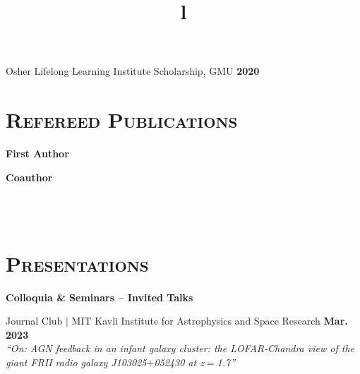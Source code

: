 \documentclass[marg, centered]{res}
\begin{document}
\begin{resume}
{Osher Lifelong Learning Institute Scholarship, GMU \hfill \textbf{2020}}
\vspace{-0.0cm}


\section{{\scshape \bfseries Refereed Publications}}

\vspace{-0.1cm}
\textbf{First Author}
\vspace{0.05cm}

\textbf{Coauthor}
\vspace{0.05cm}
\vspace{0.05cm}


\begin{format}
\title{l} \\
 \\
\body
\end{format}

\section{{\scshape \bfseries Presentations} \\
\vspace{0.1cm}
}

\textbf{Colloquia \& Seminars -- Invited Talks}

\begin{talks}[itemindent=0pt, leftmargin=19pt]

\item Journal Club $|$ MIT Kavli Institute for Astrophysics and Space Research \hfill \textbf{Mar. 2023} \\
\textit{``On: AGN feedback in an infant galaxy cluster: the LOFAR-Chandra view of the giant FRII radio galaxy J103025$+$052430 at z$=$1.7''}


\end{talks}
\end{resume}
\end{document}
